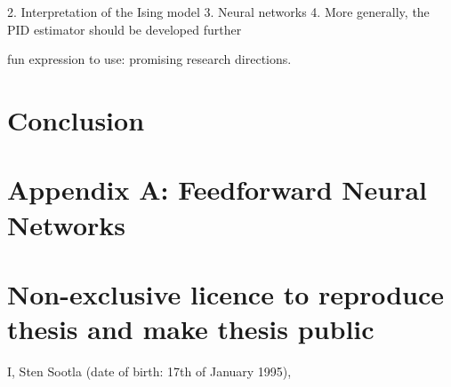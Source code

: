 \documentclass[12pt]{article}
\begin{document}
2. Interpretation of the Ising model 
3. Neural networks
4. More generally, the PID estimator should be developed further

fun expression to use: promising research directions.

\newpage
\section*{Conclusion}


\newpage



\newpage
\section*{Appendix A: Feedforward Neural Networks}


\appendix
\pagebreak
\section*{\small Non-exclusive licence to reproduce thesis and make thesis public}


I, Sten Sootla (date of birth: 17th of January 1995),
\end{document}
